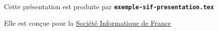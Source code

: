   \item Cette présentation est produite par \texttt{\textbf{exemple-sif-presentation.tex}}
  \item Elle est conçue pour la \href{https://www.societe-informatique-de-france.fr}{Société Informatique de France}
